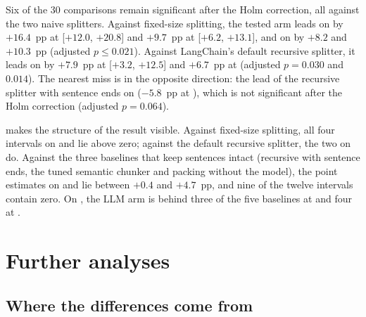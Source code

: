 Six of the 30 comparisons remain significant after the Holm correction, all against the
two naive splitters. Against fixed-size splitting, the tested arm leads on 
by $+16.4$~pp at  [$+12.0$, $+20.8$] and $+9.7$~pp at  [$+6.2$, $+13.1$],
and on  by $+8.2$ and $+10.3$~pp (adjusted $p \le 0.021$). Against LangChain's
default recursive splitter, it leads on  by $+7.9$~pp at  [$+3.2$,
$+12.5$] and $+6.7$~pp at  (adjusted $p = 0.030$ and $0.014$). The nearest miss is
in the opposite direction: the lead of the recursive splitter with sentence ends on
 ($-5.8$~pp at ), which is not significant after the Holm correction
(adjusted $p = 0.064$).

 makes the structure of the result visible. Against fixed-size splitting,
all four intervals on  and  lie above zero; against the default
recursive splitter, the two on  do. Against the three baselines that keep
sentences intact (recursive with sentence ends, the tuned semantic chunker and packing
without the model), the point estimates on  and  lie between
$+0.4$ and $+4.7$~pp, and nine of the twelve intervals contain zero. On , the
LLM arm is behind three of the five baselines at  and four at .

\section{Further analyses}
\label{sec:further}

\subsection*{Where the differences come from}
\label{sec:mechanism}


